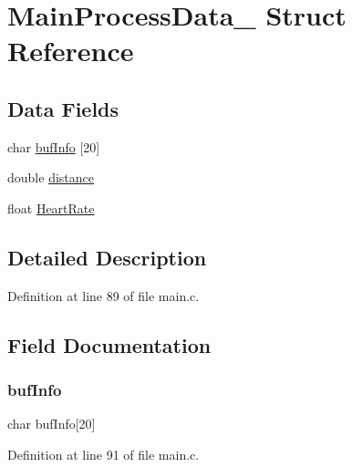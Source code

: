 \hypertarget{struct_main_process_data__}{}\section{Main\+Process\+Data\+\_\+ Struct Reference}
\label{struct_main_process_data__}
\subsection*{Data Fields}
\begin{DoxyCompactItemize}
\item 
char \mbox{\hyperlink{struct_main_process_data___ae9a120d1fe4b71425af49710ed6c7a03}{buf\+Info}} \mbox{[}20\mbox{]}
\item 
double \mbox{\hyperlink{struct_main_process_data___a79b8e036dca6911e3295a47d99f21f43}{distance}}
\item 
float \mbox{\hyperlink{struct_main_process_data___a19546b530c18a3d4bba8eafbb4778f69}{Heart\+Rate}}
\end{DoxyCompactItemize}


\subsection{Detailed Description}


Definition at line 89 of file main.\+c.



\subsection{Field Documentation}
\mbox{\label{struct_main_process_data___ae9a120d1fe4b71425af49710ed6c7a03}} 
\subsubsection{\texorpdfstring{buf\+Info}{bufInfo}}
{\footnotesize\ttfamily char buf\+Info\mbox{[}20\mbox{]}}



Definition at line 91 of file main.\+c.

\mbox{\label{struct_main_process_data___a79b8e036dca6911e3295a47d99f21f43}} 
